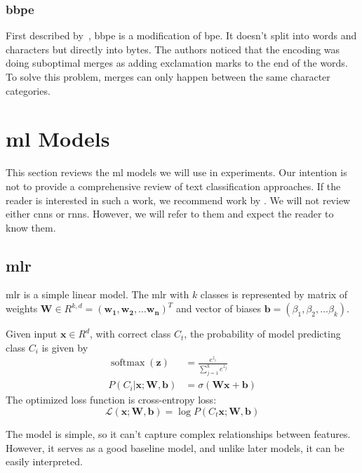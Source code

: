 \subsubsection{\acl{bbpe}}
\label{sec:bbpe}
First described by~\textcite{radfordLanguageModelsArea}, \acf{bbpe} is a modification of \ac{bpe}.
It doesn't split into words and characters but directly into bytes.
The authors noticed that the encoding was doing suboptimal merges as adding exclamation marks to the end of the words.
To solve this problem, merges can only happen between the same character categories.

\section{\acl{ml} Models}
\label{sec:models}
This section reviews the \ac{ml} models we will use in experiments.
Our intention is not to provide a comprehensive review of text classification approaches.
If the reader is interested in such a work, we recommend work by \textcite{kowsariTextClassificationAlgorithms2019}.
We will not review either \acp{cnn} or \acp{rnn}.
However, we will refer to them and expect the reader to know them.

\subsection{\acl{mlr}}
\label{sec:mlr}
\acf{mlr} is a simple linear model.
The \ac{mlr} with $k$ classes is represented by matrix of weights $\mathbf{W} \in R^{k, d} = (\mathbf{w_1}, \mathbf{w_2}, \dots \mathbf{w_n})^T$
and vector of biases $\mathbf{b} = (\beta_1, \beta_2, \dots \beta_k)$.

Given input $\mathbf{x} \in R^{d}$, with correct class $C_t$, the probability of model predicting class $C_i$ is given by
\begin{align}
    \operatorname{softmax}(\mathbf{z})          & = \frac{e^{z_i}}{\sum_{j=1}^{k} e^{z_j}}     \\
    P(C_i | \mathbf{x}; \mathbf{W}, \mathbf{b}) & = \sigma(\mathbf{W} \mathbf{x} + \mathbf{b})
\end{align}
The optimized loss function is cross-entropy loss:
\begin{equation}
    \mathcal{L}(\mathbf{x};\mathbf{W}, \mathbf{b}) = \log{P(C_t \mathbf{x}; \mathbf{W}, \mathbf{b})}
\end{equation}

The model is simple, so it can't capture complex relationships between features.
However, it serves as a good baseline model, and unlike later models, it can be easily interpreted.

